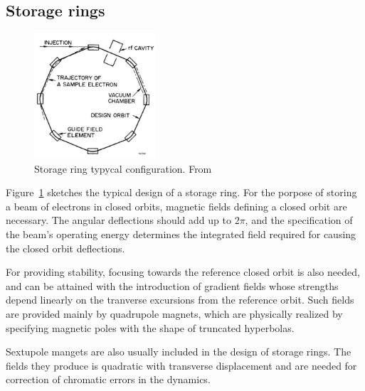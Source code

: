 \subsection{Storage rings}
\begin{figure}[htb]
    \centering
    \includegraphics[width=0.4\textwidth]{Images/storage_ring.png}
    \caption{Storage ring typycal configuration. From \cite{sands}}
    \label{fig:storage_ring}
\end{figure}
Figure~\ref{fig:storage_ring} sketches the typical design of a storage ring. For the porpose of storing a beam of electrons in closed orbits, magnetic fields defining a closed orbit are necessary. The angular deflections should add up to $2\pi$, and the specification of the beam's operating energy determines the integrated field required for causing the closed orbit deflections.

For providing stability, focusing towards the reference closed orbit is also needed, and can be attained with the introduction of gradient fields whose strengths depend linearly on the tranverse excursions from the reference orbit. Such fields are provided mainly by quadrupole magnets, which are physically realized by specifying  magnetic poles with the shape of truncated hyperbolas.

Sextupole mangets are also usually included in the design of storage rings. The fields they produce is quadratic with transverse displacement and are needed for correction of chromatic errors in the dynamics.

